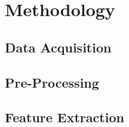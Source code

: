 \chapter{Methodology}

\section{Data Acquisition}
\section{Pre-Processing }
\section{Feature Extraction}
